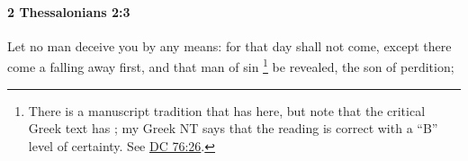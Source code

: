 			\begin{framed}
			\scriptsize
				\begin{compactdesc}
					\item[SBLG] 
				\end{compactdesc}
			\end{framed}

		\paragraph{2 Thessalonians 2:3} %
			\label{2THESSALONIANS-2-3}

			Let no man deceive you by any means: for that day shall not come, except there come a falling away first, and that man of sin%
				\footnote{%
					There is a manuscript tradition that has  here, but note that the critical Greek text has ; my Greek NT says that the  reading is correct with a ``B'' level of certainty. See \hyperref[DC76-26]{DC 76:26}.
					}
			be revealed, the son of perdition;

